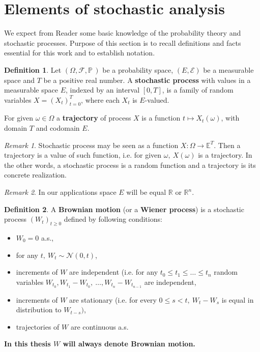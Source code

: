 \documentclass[a4paper,11pt, twoside]{book}
\theoremstyle{definition}
\newtheorem{mydef}{Definition}[chapter]
\theoremstyle{remark}
\newtheorem{remark}{Remark}[chapter]
\def\P{{\mathbb{P}}\,}
\def\R{{\mathbb{R}}}
\begin{document}
\section{Elements of stochastic analysis}
We expect from Reader some basic knowledge of the probability theory and stochastic processes. Purpose of this section is to recall definitions and facts essential for this work and to establish notation.

\begin{mydef}
 Let $(\Omega, \mathcal{F}, \P)$ be a probability space, $(E, \mathcal{E})$ be a measurable space and $T$ be a positive real number. A \textbf{stochastic process} with values in a measurable space $E$, indexed by an interval $[0,T]$, is a family of random variables $X = (X_t)_{t = 0}^T$, where each $X_t$ is $E$-valued.
 
 For given $\omega \in \Omega$ a \textbf{trajectory} of process $X$ is a function $t \mapsto X_t(\omega)$, with domain $T$ and codomain $E$.
\end{mydef}

\begin{remark}
 Stochastic process may be seen as a function $X: \Omega \rightarrow \mathbb{E}^T$. Then a trajectory is a value of such function, i.e. for given $\omega,\ X(\omega)$ is a trajectory. In the other words, a stochastic process is a random function and a trajectory is its concrete realization.
\end{remark}

\begin{remark}
 In our applications space $E$ will be equal $\R$ or $\R^n$. 
\end{remark}

\begin{mydef}
 A \textbf{Brownian motion} (or a \textbf{Wiener process}) is a stochastic process $(W_t)_{t \geq 0}$ defined by following conditions:
 \begin{itemize}
  \item $W_0 = 0$ a.s.,
  \item for any $t,\ W_t \sim \mathcal{N}(0,t)$,
  \item increments of $W$ are independent (i.e. for any $t_0 \leq t_1 \leq \ldots \leq t_n$ random variables $W_{t_0}, W_{t_1} - W_{t_0},\ \ldots, W_{t_n} - W_{t_{n-1}}$ are independent,
  \item increments of $W$ are stationary (i.e. for every $0 \leq s < t,\ W_t-W_s$ is equal in distribution to $W_{t-s})$,
  \item trajectories of $W$ are continuous a.s.
 \end{itemize}
\end{mydef}
\noindent \textbf{In this thesis $W$ will always denote Brownian motion.}
\end{document}
